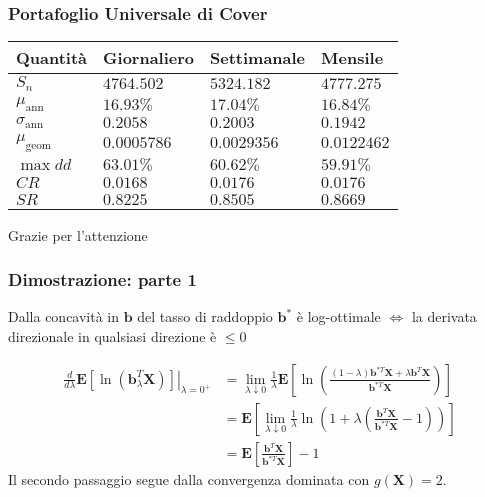 \documentclass{beamer}
\theoremstyle{plain}
\theoremstyle{definition}
\theoremstyle{remark}
\newcommand{\X}{\bm{X}}
\newcommand{\B}{\bm{b}}
\begin{document}
\begin{frame}
	\frametitle{Portafoglio Universale di Cover}
	\begin{table}[H]
		\centering
		\begin{tabular}{|l|l|l|l|}
			\hline
			Quantità 			  & Giornaliero	 & Settimanale 	& Mensile		\\\hline
			$S_n$                 & $4764.502$   & $5324.182$	& $4777.275$ 	\\
			$\mu_{\text{ann}}$    & $16.93\%$    & $17.04\%$	& $16.84\%$		\\
			$\sigma_{\text{ann}}$ & $0.2058$     & $0.2003$		& $0.1942$		\\
			$\mu_{\text{geom}}$   & $0.0005786$  & $0.0029356$	& $0.0122462$	\\
			$\max dd$             & $63.01\%$    & $60.62\%$	& $59.91\%$		\\
			$CR$                  & $0.0168$     & $0.0176$		& $0.0176$		\\
			$SR$                  & $0.8225$     & $0.8505$		& $0.8669$		\\\hline
		\end{tabular}
	\end{table}
\end{frame}
\nocite{Klenke}
\nocite{CTElInfTeo}
\nocite{Cost1998}
\nocite{CoverOrden1996}
\nocite{LZ78}
\nocite{Mennucci}
\nocite{NN}
\nocite{ThorpKelly}
\nocite{algoet1988}
\nocite{algoet1992}


\begin{frame}
\Huge{\centerline{Grazie per l'attenzione}}
\end{frame}





\begin{frame}[label=KTdim]
\frametitle{Dimostrazione: parte 1}
\begin{block}{}
	Dalla concavità in $\B$ del tasso di raddoppio $\B^*$ è log-ottimale $\iff$ la derivata direzionale in qualsiasi direzione è $\leq 0$
\end{block}
\begin{block}{}
	\begin{equation*}
	\begin{split}
	\left.\frac{d}{d\lambda}\mathbf{E}[\ln(\B_\lambda^T\X)]\right\vert_{\lambda=0^+}
	& = \lim\limits_{\lambda\downarrow 0}\frac{1}{\lambda}\mathbf{E}\left[\ln\left(\frac{(1-\lambda)\B^{*T}\X + \lambda\B^T\X}{\B^{*T}\X}\right)\right]\\
	& = \mathbf{E}\left[\lim\limits_{\lambda\downarrow 0}\frac{1}{\lambda}\ln\left(1+\lambda\left(\frac{\B^T\X}{\B^{*T}\X}-1\right)\right)\right]\\
	& = \mathbf{E}\left[\frac{\B^T\X}{\B^{*T}\X}\right]-1
	\end{split}
	\end{equation*}
	Il secondo passaggio segue dalla convergenza dominata con $g(\X)=2$.
\end{block}
\end{frame}
\end{document}

